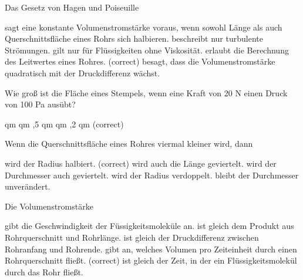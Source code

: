 \documentclass[11pt]{exam}
\begin{document}
\setlength{\voffset}{-0.5in}
\setlength{\headsep}{5pt}

\hspace{2mm}
 \hspace{5mm}
\vspace{4mm}

\begin{questions}

\question Das Gesetz von Hagen und Poiseuille

\begin{choices}
	\choice sagt eine konstante Volumenstromstärke voraus, wenn sowohl Länge als auch Querschnittsfläche eines Rohrs sich halbieren.
	\choice beschreibt nur turbulente Strömungen.
	\choice gilt nur für Flüssigkeiten ohne Viskosität.
	\choice erlaubt die Berechnung des Leitwertes eines Rohres. (correct)
	\choice besagt, dass die Volumenstromstärke quadratisch mit der Druckdifferenz wächst.
\end{choices}

\vspace{3mm}\question Wie groß ist die Fläche eines Stempels, wenn eine Kraft von 20 N einen Druck von 100 Pa ausübt?

\begin{choices}
	 qm
	 qm
	,5 qm
	 qm
	,2 qm (correct)
\end{choices}

\vspace{3mm}\question Wenn die Querschnittsfläche eines Rohres viermal kleiner wird, dann

\begin{choices}
	\choice wird der Radius halbiert. (correct)
	\choice wird auch die Länge geviertelt.
	\choice wird der Durchmesser auch geviertelt.
	\choice wird der Radius verdoppelt.
	\choice bleibt der Durchmesser unverändert.
\end{choices}

\vspace{3mm}\question Die Volumenstromstärke

\begin{choices}
	\choice gibt die Geschwindigkeit der Füssigkeitsmoleküle an.
	\choice ist gleich dem Produkt aus Rohrquerschnitt und Rohrlänge.
	\choice ist gleich der Druckdifferenz zwischen Rohranfang und Rohrende.
	\choice gibt an, welches Volumen pro Zeiteinheit durch einen Rohrquerschnitt fließt. (correct)
	\choice ist gleich der Zeit, in der ein Flüssigkeitsmolekül durch das Rohr fließt.
\end{choices}


\end{questions}
\end{document}
